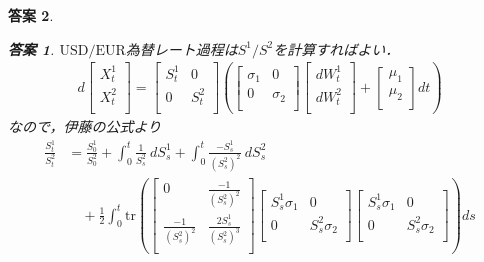 \documentclass[11pt,a4paper]{jsarticle}
\theoremstyle{mystyle}
\newtheorem*{ans}{答案}
\begin{document}
\begin{ans}
\begin{ans}
	$\mbox{USD}/\mbox{EUR}$為替レート過程は$S^{1}/S^{2}$を計算すればよい．
	\begin{align}
		d\begin{bmatrix}
			X^{1}_{t} \\
			X^{2}_{t} \\
		\end{bmatrix} = 
		\begin{bmatrix}
			S^{1}_{t} & 0 \\
			0 & S^{2}_{t} \\
		\end{bmatrix}
		\left(
		\begin{bmatrix}
			\sigma_{1} & 0 \\
			0 & \sigma_{2} \\
		\end{bmatrix}
		\begin{bmatrix}
			dW^{1}_{t} \\
			dW^{2}_{t} \\
		\end{bmatrix}
		+ 
		\begin{bmatrix}
			\mu_{1} \\
			\mu_{2} \\
		\end{bmatrix}
		dt
		\right)
	\end{align}
	なので，伊藤の公式より
	\begin{align}
		\frac{S^{1}_{t}}{S^{2}_{t}} 
		&= \frac{S^{1}_{0}}{S^{2}_{0}} + \int_{0}^{t} \frac{1}{S^{2}_{s}}\ dS^{1}_{s}
		+ \int_{0}^{t} \frac{-S^{1}_{s}}{(S^{2}_{s})^{2}}\ dS^{2}_{s} \\
		&\quad + \frac{1}{2}\int_{0}^{t} \mbox{tr}\left(
		\begin{bmatrix}
			0 & \frac{-1}{(S^{2}_{s})^{2}} \\
			\frac{-1}{(S^{2}_{s})^{2}} & \frac{2S^{1}_{s}}{(S^{2}_{s})^{3}} \\
		\end{bmatrix}
		\begin{bmatrix}
			S^{1}_{s}\sigma_{1} & 0 \\
			0 & S^{2}_{s}\sigma_{2} \\
		\end{bmatrix}
		\begin{bmatrix}
			S^{1}_{s}\sigma_{1} & 0 \\
			0 & S^{2}_{s}\sigma_{2} \\
		\end{bmatrix}
		\right)ds \\

\end{align}
\end{ans}
\end{ans}
\end{document}
